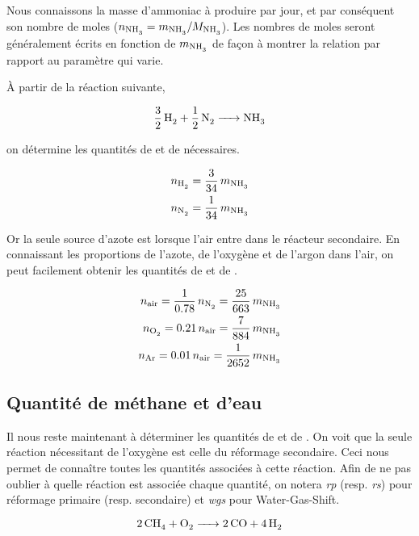 \documentclass[a4paper, oneside, 12pt]{article}
\begin{document}
Nous connaissons la masse d'ammoniac à produire par jour, 
et par conséquent son nombre de moles ($n_{\ce{NH3}} = m_{\ce{NH3}}/M_{\ce{NH3}}$).
Les nombres de moles seront généralement écrits en fonction de $m_{\ce{NH3}}$ 
de façon à montrer la relation par rapport au paramètre qui varie.

À partir de la réaction suivante,

\begin{equation*}
	\ce{\frac{3}{2} \, H2 + \frac{1}{2} \, N2 -> NH3} 
\end{equation*}

on détermine les quantités de  et de  nécessaires.

\begin{align}
	n_{\ce{H2}} = \frac{3}{34} \, m_{\ce{NH3}} 
	\label{eq:moles_H2} \\
	n_{\ce{N2}} = \frac{1}{34} \, m_{\ce{NH3}} \nonumber
\end{align}

Or la seule source d'azote est lorsque l'air entre dans le réacteur secondaire.
En connaissant les proportions de l'azote, de l'oxygène et de l'argon dans 
l'air, on peut facilement obtenir les quantités de  et de .

\begin{align*}
	n_{\text{air}} = \frac{1}{0.78} \, n_{\ce{N2}} = \frac{25}{663} \, m_{\ce{NH3}} \\
	n_{\ce{O2}} = 0.21 \, n_{\text{air}} = \frac{7}{884} \, m_{\ce{NH3}} \\
	n_{\ce{Ar}} = 0.01 \, n_{\text{air}} = \frac{1}{2652} \, m_{\ce{NH3}} 
\end{align*}

\subsection{Quantité de méthane et d'eau}

Il nous reste maintenant à déterminer les quantités de  et de .
On voit que la seule réaction nécessitant de l'oxygène est celle du 
réformage secondaire. Ceci nous permet de conna\^itre toutes les quantités 
associées à cette réaction. 
Afin de ne pas oublier à quelle réaction est associée chaque quantité, 
on notera \textit{rp} (resp. \textit{rs}) pour réformage primaire (resp. secondaire)
et \textit{wgs} pour Water-Gas-Shift.

\begin{equation*}
	\ce{2CH4 + O2 -> 2CO + 4H2}
\end{equation*}
\end{document}
